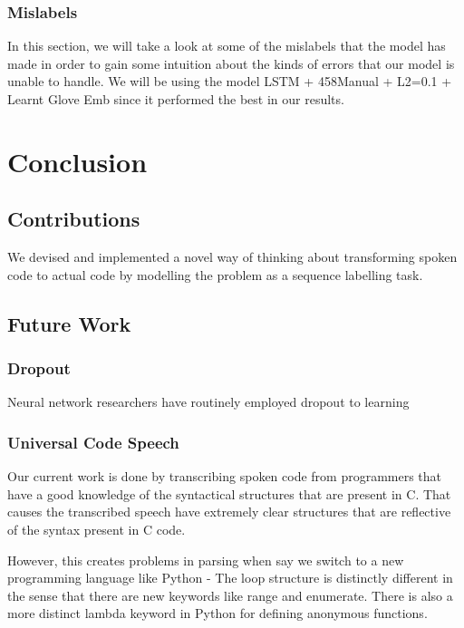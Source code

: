 \documentclass[fyp]{socreport}
\begin{document}
\subsection{Mislabels}
In this section, we will take a look at some of the mislabels that the model
has made in order to gain some intuition about the kinds of errors that
our model is unable to handle. We will be using the model LSTM + 458Manual +
L2=0.1 + Learnt Glove Emb since it performed the best in our results.




\chapter{Conclusion}

\section{Contributions}
We devised and implemented a novel way of thinking about transforming spoken
code to actual code by modelling the problem as a sequence labelling task.

\section{Future Work}
\subsection{Dropout}
Neural network researchers have routinely employed dropout to learning

\subsection{Universal Code Speech}
Our current work is done by transcribing spoken code from programmers that have
a good knowledge of the syntactical structures that are present in C. That
causes the transcribed speech have extremely clear structures that are
reflective of the syntax present in C code.

However, this creates problems in parsing when say we switch to a new
programming language like Python - The loop structure is distinctly different
in the sense that there are new keywords like range and enumerate. There is
also a more distinct lambda keyword in Python for defining anonymous functions.
\end{document}
